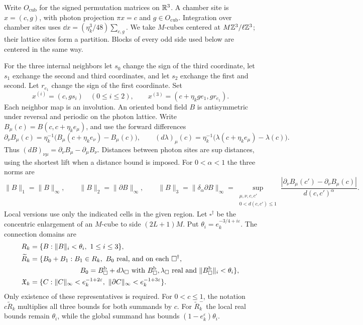 Write \(O_{\mathrm{cub}}\) for the signed permutation matrices on
\(\mathbb R^3\). A chamber site is \(x=(c,g)\), with photon projection
\(\pi x=c\) and \(g\in O_{\mathrm{cub}}\). Integration over chamber
sites uses \(\dd x=(\eta_k^3/48)\sum_{c,g}\). We take
\(M\)-cubes centered at \(M\mathbb Z^3/\ell\mathbb Z^3\); their lattice sites
form a partition. Blocks of every odd side used below are centered
in the same way.

For the three internal neighbors let \(s_0\) change the sign of
the third coordinate, let \(s_1\) exchange the second and third
coordinates, and let \(s_2\) exchange the first and second.
Let \(r_{e_1}\) change the sign of the first coordinate. Set
\[
 x^{(i)}=(c,gs_i)\quad(0\le i\le2),\qquad
 x^{(3)}=(c+\eta_kge_1,gr_{e_1}).
\]
Each neighbor map is an involution. An oriented bond field
\(B\) is antisymmetric under reversal and periodic on the photon
lattice. Write \(B_\mu(c)=B(c,c+\eta_ke_\mu)\), and use the
forward differences
\[
 \partial_\nu B_\mu(c)=
       \eta_k^{-1}\bigl(B_\mu(c+\eta_ke_\nu)-B_\mu(c)\bigr),
 \qquad
 (d\lambda)_\mu(c)=
       \eta_k^{-1}\bigl(\lambda(c+\eta_ke_\mu)-\lambda(c)\bigr).
\]
Thus \((dB)_{\nu\mu}=\partial_\nu B_\mu-\partial_\mu B_\nu\).
Distances between photon sites are sup distances, using the
shortest lift when a distance bound is imposed. For \(0<\alpha<1\)
the three norms are
\[
 \|B\|_1=\|B\|_\infty,\qquad
 \|B\|_2=\|\partial B\|_\infty,\qquad
 \|B\|_3=\|\delta_\alpha\partial B\|_\infty
 =\sup_{\substack{\mu,\nu,c,c'\\0<d(c,c')\le1}}
 \frac{|\partial_\nu B_\mu(c')-\partial_\nu B_\mu(c)|}
      {d(c,c')^\alpha}.
\]
Local versions use only the indicated cells in the given region.
Let \(\square^\dagger\) be the concentric enlargement of an
\(M\)-cube to side \((2L+1)M\). Put
\(\theta_i=e_k^{-3/4+i\varepsilon}\).
The connection domains are
\begin{equation}\label{eq:connection-domains}
\begin{split}
 R_k&=\{B:\|B\|_i<\theta_i,\ 1\le i\le3\},\\
 \widetilde R_k&=\{B_0+B_1:B_1\in R_k,\ B_0\text{ real, and on each }
          \square^\dagger,\\
 &\hspace{25mm} B_0=B_\square^{\mathrm b}+d\lambda_\square
   \text{ with }B_\square^{\mathrm b},\lambda_\square\text{ real and }
          \|B_\square^{\mathrm b}\|_i<\theta_i\},\\
 \mathfrak X_k&=\{C:\|C\|_\infty<e_k^{-1+2\varepsilon},\
                       \|\partial C\|_\infty<e_k^{-1+3\varepsilon}\}.
\end{split}
\end{equation}
Only existence of these representatives is required.
For \(0<c\le1\), the notation \(c\widetilde R_k\) multiplies
all three bounds for both summands by \(c\).
For \(\widetilde R_k^-\) the local real bounds remain
\(\theta_i\), while the global summand has bounds
\((1-e_k^\varepsilon)\theta_i\).

